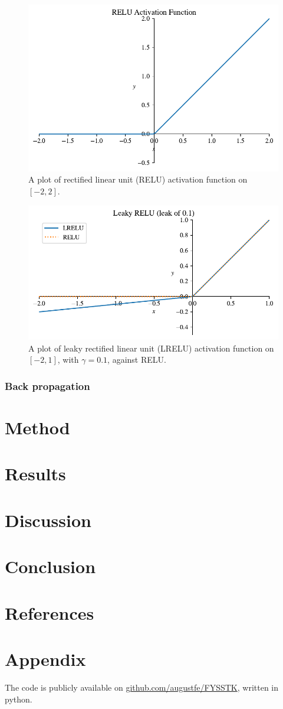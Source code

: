 \documentclass{article}
\theoremstyle{definition}
\begin{document}
\begin{figure}[ht]
    \centering
    \includegraphics[width=.7\textwidth]{activators/RELU.pdf}
    \caption{A plot of rectified linear unit (RELU) activation function on $[-2, 2]$.}
    \label{fig:RELU}
\end{figure}

\begin{figure}[ht]
    \centering
    \includegraphics[width=.7\textwidth]{activators/LRELU.pdf}
    \caption{A plot of leaky rectified linear unit (LRELU) activation function on $[-2, 1]$, with $\gamma=0.1$, against RELU.}
    \label{fig:LRELU}
\end{figure}


\subsubsection{Back propagation}

\section{Method}

\section{Results}

\section{Discussion}

\section{Conclusion}

\section{References}


\section{Appendix}
The code is publicly available on \href{https://github.com/augustfe/FYSSTK}{github.com/augustfe/FYSSTK}, written in python.
\end{document}
